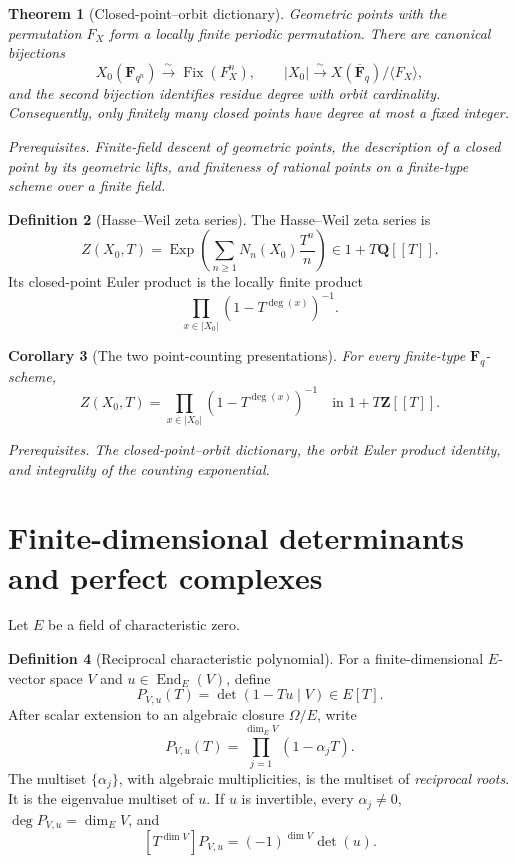 \documentclass[10pt]{article}
\newtheorem{theorem}{Theorem}[section]
\newtheorem{corollary}[theorem]{Corollary}
\theoremstyle{definition}
\newtheorem{definition}[theorem]{Definition}
\newcommand{\Fq}{\mathbf F_q}
\newcommand{\Fbar}{\overline{\mathbf F}_q}
\newcommand{\End}{\operatorname{End}}
\newcommand{\Fix}{\operatorname{Fix}}
\newcommand{\deps}[1]{\par\smallskip\noindent\textit{Prerequisites.} #1}
\begin{document}
\begin{theorem}[Closed-point--orbit dictionary]
Geometric points with the permutation \(F_X\) form a locally finite
periodic permutation.  There are canonical bijections
\[
 X_0(\mathbf F_{q^n})\xrightarrow{\sim}\Fix(F_X^n),
 \qquad
 |X_0|\xrightarrow{\sim}X(\Fbar)/\langle F_X\rangle,
\]
and the second bijection identifies residue degree with orbit cardinality.
Consequently, only finitely many closed points have degree at most a fixed
integer.
\deps{Finite-field descent of geometric points, the description of a closed
point by its geometric lifts, and finiteness of rational points on a
finite-type scheme over a finite field.}
\end{theorem}

\begin{definition}[Hasse--Weil zeta series]
The Hasse--Weil zeta series is
\[
 Z(X_0,T)=
 \operatorname{Exp}\left(\sum_{n\geq1}N_n(X_0)\frac{T^n}{n}\right)
 \in1+T\mathbf Q[[T]].
\]
Its closed-point Euler product is the locally finite product
\[
 \prod_{x\in|X_0|}(1-T^{\deg(x)})^{-1}.
\]
\end{definition}

\begin{corollary}[The two point-counting presentations]
For every finite-type \(\Fq\)-scheme,
\[
 \boxed{
 Z(X_0,T)=
 \prod_{x\in|X_0|}(1-T^{\deg(x)})^{-1}}
 \quad\text{in }1+T\mathbf Z[[T]].
\]
\deps{The closed-point--orbit dictionary, the orbit Euler product identity,
and integrality of the counting exponential.}
\end{corollary}

\section{Finite-dimensional determinants and perfect complexes}

Let \(E\) be a field of characteristic zero.

\begin{definition}[Reciprocal characteristic polynomial]
For a finite-dimensional \(E\)-vector space \(V\) and
\(u\in\End_E(V)\), define
\[
 P_{V,u}(T)=\det(1-Tu\mid V)\in E[T].
\]
After scalar extension to an algebraic closure \(\Omega/E\), write
\[
 P_{V,u}(T)=\prod_{j=1}^{\dim_E V}(1-\alpha_jT).
\]
The multiset \(\{\alpha_j\}\), with algebraic multiplicities, is the
multiset of \emph{reciprocal roots}.  It is the eigenvalue multiset of \(u\).
If \(u\) is invertible, every \(\alpha_j\neq0\),
\(\deg P_{V,u}=\dim_E V\), and
\[
 [T^{\dim V}]P_{V,u}=(-1)^{\dim V}\det(u).
\]
\end{definition}
\end{document}
